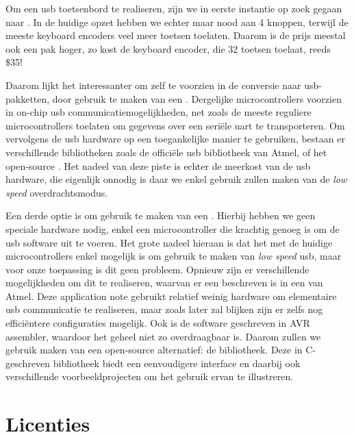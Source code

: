 Om een \ac{usb} toetsenbord te realiseren, zijn we in eerste instantie op zoek gegaan naar . In de huidige opzet hebben we echter maar nood aan 4 knoppen, terwijl de meeste keyboard encoders veel meer toetsen toelaten. Daarom is de prijs meestal ook een pak hoger, zo kost de  keyboard encoder, die 32 toetsen toelaat, reeds \$35!

Daarom lijkt het interessanter om zelf te voorzien in de conversie naar \ac{usb}-pakketten, door gebruik te maken van een . Dergelijke microcontrollers voorzien in on-chip \ac{usb} communicatiemogelijkheden, net zoals de meeste reguliere microcontrollers toelaten om gegevens over een seriële \ac{uart} te transporteren. Om vervolgens de \ac{usb} hardware op een toegankelijke manier te gebruiken, bestaan er verschillende bibliotheken zoals de officiële \ac{usb} bibliotheek van Atmel, of het open-source . Het nadeel van deze piste is echter de meerkost van de \ac{usb} hardware, die eigenlijk onnodig is daar we enkel gebruik zullen maken van de \emph{low speed} overdrachtsmodus.

Een derde optie is om gebruik te maken van een . Hierbij hebben we geen speciale hardware nodig, enkel een microcontroller die krachtig genoeg is om de \ac{usb} software uit te voeren. Het grote nadeel hieraan is dat het met de huidige microcontrollers enkel mogelijk is om gebruik te maken van \emph{low speed} \ac{usb}, maar voor onze toepassing is dit geen probleem. Opnieuw zijn er verschillende mogelijkheden om dit te realiseren, waarvan er een beschreven is in een  van Atmel. Deze application note gebruikt relatief weinig hardware om elementaire \ac{usb} communicatie te realiseren, maar zoals later zal blijken zijn er zelfs nog efficiëntere configuraties mogelijk. Ook is de software geschreven in AVR assembler, waardoor het geheel niet zo overdraagbaar is. Daarom zullen we gebruik maken van een open-source alternatief: de  bibliotheek. Deze in C-geschreven bibliotheek biedt een eenvoudigere interface en daarbij ook verschillende voorbeeldprojecten om het gebruik ervan te illustreren.


%
%

\chapter{Licenties}

